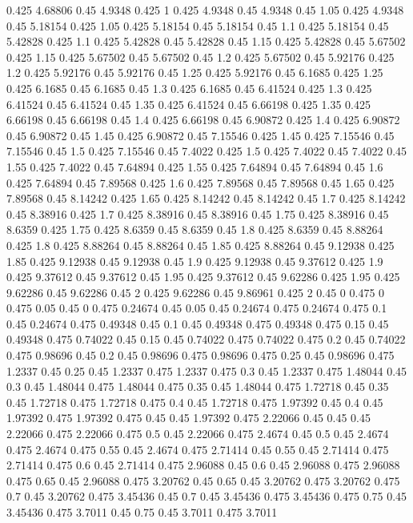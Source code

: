 0.425 4.68806
0.45 4.9348
0.425 1
0.425 4.9348
0.45 4.9348
0.45 1.05
0.425 4.9348
0.45 5.18154
0.425 1.05
0.425 5.18154
0.45 5.18154
0.45 1.1
0.425 5.18154
0.45 5.42828
0.425 1.1
0.425 5.42828
0.45 5.42828
0.45 1.15
0.425 5.42828
0.45 5.67502
0.425 1.15
0.425 5.67502
0.45 5.67502
0.45 1.2
0.425 5.67502
0.45 5.92176
0.425 1.2
0.425 5.92176
0.45 5.92176
0.45 1.25
0.425 5.92176
0.45 6.1685
0.425 1.25
0.425 6.1685
0.45 6.1685
0.45 1.3
0.425 6.1685
0.45 6.41524
0.425 1.3
0.425 6.41524
0.45 6.41524
0.45 1.35
0.425 6.41524
0.45 6.66198
0.425 1.35
0.425 6.66198
0.45 6.66198
0.45 1.4
0.425 6.66198
0.45 6.90872
0.425 1.4
0.425 6.90872
0.45 6.90872
0.45 1.45
0.425 6.90872
0.45 7.15546
0.425 1.45
0.425 7.15546
0.45 7.15546
0.45 1.5
0.425 7.15546
0.45 7.4022
0.425 1.5
0.425 7.4022
0.45 7.4022
0.45 1.55
0.425 7.4022
0.45 7.64894
0.425 1.55
0.425 7.64894
0.45 7.64894
0.45 1.6
0.425 7.64894
0.45 7.89568
0.425 1.6
0.425 7.89568
0.45 7.89568
0.45 1.65
0.425 7.89568
0.45 8.14242
0.425 1.65
0.425 8.14242
0.45 8.14242
0.45 1.7
0.425 8.14242
0.45 8.38916
0.425 1.7
0.425 8.38916
0.45 8.38916
0.45 1.75
0.425 8.38916
0.45 8.6359
0.425 1.75
0.425 8.6359
0.45 8.6359
0.45 1.8
0.425 8.6359
0.45 8.88264
0.425 1.8
0.425 8.88264
0.45 8.88264
0.45 1.85
0.425 8.88264
0.45 9.12938
0.425 1.85
0.425 9.12938
0.45 9.12938
0.45 1.9
0.425 9.12938
0.45 9.37612
0.425 1.9
0.425 9.37612
0.45 9.37612
0.45 1.95
0.425 9.37612
0.45 9.62286
0.425 1.95
0.425 9.62286
0.45 9.62286
0.45 2
0.425 9.62286
0.45 9.86961
0.425 2
0.45 0
0.475 0
0.475 0.05
0.45 0
0.475 0.24674
0.45 0.05
0.45 0.24674
0.475 0.24674
0.475 0.1
0.45 0.24674
0.475 0.49348
0.45 0.1
0.45 0.49348
0.475 0.49348
0.475 0.15
0.45 0.49348
0.475 0.74022
0.45 0.15
0.45 0.74022
0.475 0.74022
0.475 0.2
0.45 0.74022
0.475 0.98696
0.45 0.2
0.45 0.98696
0.475 0.98696
0.475 0.25
0.45 0.98696
0.475 1.2337
0.45 0.25
0.45 1.2337
0.475 1.2337
0.475 0.3
0.45 1.2337
0.475 1.48044
0.45 0.3
0.45 1.48044
0.475 1.48044
0.475 0.35
0.45 1.48044
0.475 1.72718
0.45 0.35
0.45 1.72718
0.475 1.72718
0.475 0.4
0.45 1.72718
0.475 1.97392
0.45 0.4
0.45 1.97392
0.475 1.97392
0.475 0.45
0.45 1.97392
0.475 2.22066
0.45 0.45
0.45 2.22066
0.475 2.22066
0.475 0.5
0.45 2.22066
0.475 2.4674
0.45 0.5
0.45 2.4674
0.475 2.4674
0.475 0.55
0.45 2.4674
0.475 2.71414
0.45 0.55
0.45 2.71414
0.475 2.71414
0.475 0.6
0.45 2.71414
0.475 2.96088
0.45 0.6
0.45 2.96088
0.475 2.96088
0.475 0.65
0.45 2.96088
0.475 3.20762
0.45 0.65
0.45 3.20762
0.475 3.20762
0.475 0.7
0.45 3.20762
0.475 3.45436
0.45 0.7
0.45 3.45436
0.475 3.45436
0.475 0.75
0.45 3.45436
0.475 3.7011
0.45 0.75
0.45 3.7011
0.475 3.7011
